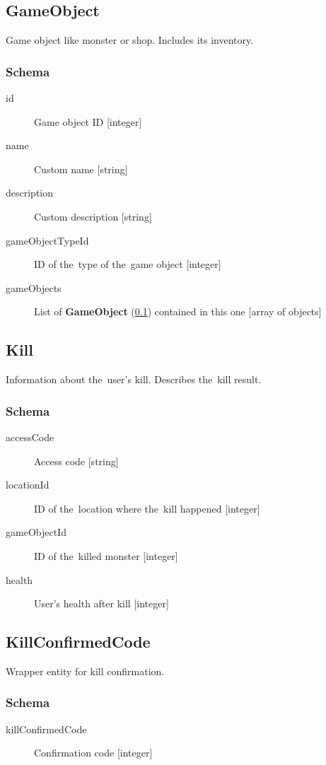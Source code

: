 	\subsection{GameObject}
		\label{json:gameobject}
		Game object like monster or shop. Includes its inventory.

		\subsubsection{Schema}
			\begin{description}
				\item[id] Game object ID [integer]
				\item[name] Custom name [string]
				\item[description] Custom description [string]
				\item[gameObjectTypeId] ID of the~type of the~game object [integer]
				\item[gameObjects] List of \textbf{GameObject} (\ref{json:gameobject}) contained in this one [array of objects]
			\end{description}
	
	\subsection{Kill}
		\label{json:kill}
		Information about the~user's kill. Describes the~kill result.
		\subsubsection{Schema}
			\begin{description}
				\item[accessCode] Access code [string]
				\item[locationId] ID of the~location where the~kill happened [integer]
				\item[gameObjectId] ID of the~killed monster [integer]
				\item[health] User's health after kill [integer]
			\end{description}
	
	\subsection{KillConfirmedCode}
		\label{json:killconfirm}
		Wrapper entity for kill confirmation.
		\subsubsection{Schema}
			\begin{description}
				\item[killConfirmedCode] Confirmation code [integer]
			\end{description}
	
